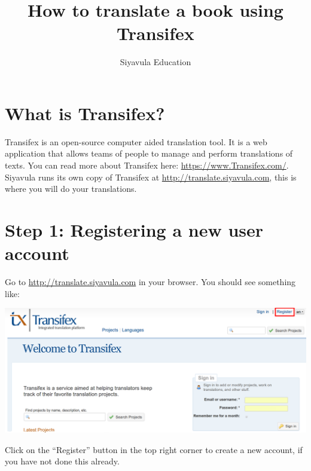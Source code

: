 \documentclass[10pt, a4paper]{article}
\title{How to translate a book using Transifex}
\author{Siyavula Education}
\date{}
\begin{document}
\maketitle

\section*{What is Transifex?}

Transifex is an open-source computer aided translation tool. It is a web application that allows teams of people to manage and perform translations of texts. You can read more about Transifex here: \url{https://www.Transifex.com/}. Siyavula  runs its own copy of Transifex at  \url{http://translate.siyavula.com}, this is where you will do your translations.


\section*{Step 1: Registering a new user account}

Go to \url{http://translate.siyavula.com} in your browser. You should see something like:

\begin{center}
    \centerline{\includegraphics[width=0.8\paperwidth]{images/Screenshot.png}}
\end{center}
Click on the ``Register'' button in the top right corner to create a new account, if you have not done this already.
\end{document}
